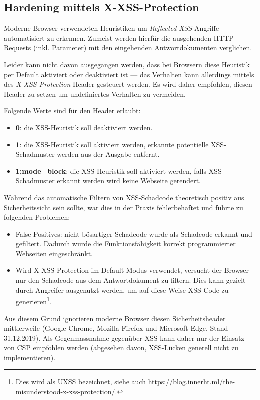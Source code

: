 \subsection{Hardening mittels X-XSS-Protection}
\label{x_xss_protection}

Moderne Browser verwendeten Heuristiken um \textit{Reflected-XSS} Angriffe automatisiert zu erkennen. Zumeist werden hierfür die ausgehenden HTTP Requests (inkl. Parameter) mit den eingehenden Antwortdokumenten verglichen.

Leider kann nicht davon ausgegangen werden, dass bei Browsern diese Heuristik per Default aktiviert oder deaktiviert ist --- das Verhalten kann allerdings mittels des \textit{X-XSS-Protection}-Header gesteuert werden. Es wird daher empfohlen, diesen Header zu setzen um undefiniertes Verhalten zu vermeiden.

Folgende Werte sind für den Header erlaubt:

\begin{itemize}
	\item \textbf{0}: die XSS-Heuristik soll deaktiviert werden.
	\item \textbf{1}: die XSS-Heuristik soll aktiviert werden, erkannte potentielle XSS-Schadmuster werden aus der Ausgabe entfernt.
	\item \textbf{1;mode=block}: die XSS-Heuristik soll aktiviert werden, falls XSS-Schadmuster erkannt werden wird keine Webseite gerendert.
\end{itemize}

Während das automatische Filtern von XSS-Schadcode theoretisch positiv aus Sicherheitssicht sein sollte, war dies in der Praxis fehlerbehaftet und führte zu folgenden Problemen:

\begin{itemize}
	\item False-Positives: nicht bösartiger Schadcode wurde als Schadcode erkannt und gefiltert. Dadurch wurde die Funktionsfähigkeit korrekt programmierter Webseiten eingeschränkt.
	\item Wird X-XSS-Protection im Default-Modus verwendet, versucht der Browser nur den Schadcode aus dem Antwortdokument zu filtern. Dies kann gezielt durch Angreifer ausgenutzt werden, um auf diese Weise XSS-Code zu generieren\footnote{Dies wird als UXSS bezeichnet, siehe auch \url{https://blog.innerht.ml/the-misunderstood-x-xss-protection/}.}.
\end{itemize}

Aus diesem Grund ignorieren moderne Browser diesen Sicherheitsheader mittlerweile (Google Chrome, Mozilla Firefox und Microsoft Edge, Stand 31.12.2019). Als Gegenmassnahme gegenüber XSS kann daher nur der Einsatz von CSP empfohlen werden (abgesehen davon, XSS-Lücken generell nicht zu implementieren).

